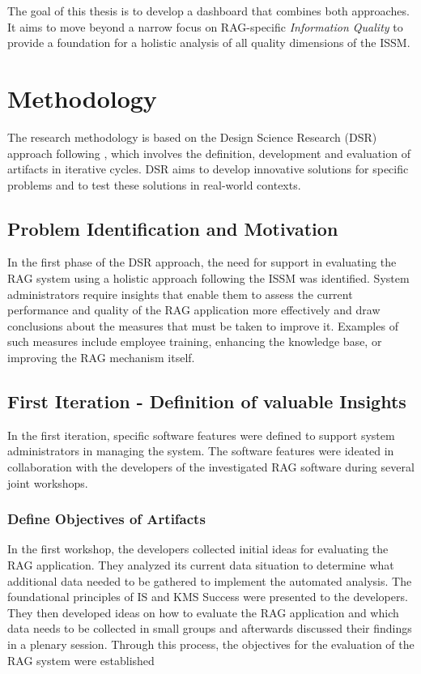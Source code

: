 \documentclass[
	english,
	ruledheaders=section,%
	class=report,%
	thesis={type=bachelor},%
	accentcolor=1b,%
	custommargins=true,%
	marginpar=false,%
	parskip=half-,%
	fontsize=11pt,%
	DIV=14,
]{tudapub}
\begin{document}
The goal of this thesis is to develop a dashboard that combines both approaches. It aims to move beyond a narrow focus on RAG-specific \textit{Information Quality} to provide a foundation for a holistic analysis of all quality dimensions of the ISSM.\\
\chapter{Methodology}
The research methodology is based on the Design Science Research (DSR) approach following \cite{Peffers2007}, which involves the definition, development and evaluation of artifacts in iterative cycles. DSR aims to develop innovative solutions for specific problems and to test these solutions in real-world contexts.
\section{Problem Identification and Motivation}
In the first phase of the DSR approach, the need for support in evaluating the RAG system using a holistic approach following the ISSM \parencite{DeloneMcLean2003ISSuccessTenYearUpdate} was identified. System administrators require insights that enable them to assess the current performance and quality of the RAG application more effectively and draw conclusions about the measures that must be taken to improve it. Examples of such measures include employee training, enhancing the knowledge base, or improving the RAG mechanism itself.
\section{First Iteration - Definition of valuable Insights}
In the first iteration, specific software features were defined to support system administrators in managing the system. The software features were ideated in collaboration with the developers of the investigated RAG software during several joint workshops.
\subsection{Define Objectives of Artifacts}
In the first workshop, the developers collected initial ideas for evaluating the RAG application. They analyzed its current data situation to determine what additional data needed to be gathered to implement the automated analysis. The foundational principles of IS \parencite{DeloneMcLean2003ISSuccessTenYearUpdate} and KMS Success \parencite{Jennex2006} were presented to the developers. They then developed ideas on how to evaluate the RAG application and which data needs to be collected in small groups and afterwards discussed their findings in a plenary session. Through this process, the objectives for the evaluation of the RAG system were established
\end{document}
